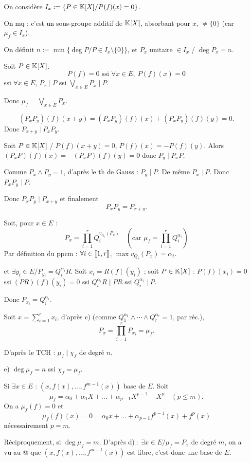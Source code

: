 \begin{solution}
On considère $I_x:=\{P\in\mathbb K[X]/P(f)(x)=0\}$.

On mq : c'est un sous-groupe additif de $\mathbb K[X]$, absorbant pour $x$,
$\neq\{0\}$ (car $\mu_f\in I_x$).

On définit $n:=\min\{\deg P/P\in I_x\setminus\{0\}\}$, et $P_x$ unitaire
$\in I_x$ / $\deg P_x=n$.

Soit $P\in\mathbb K[X]$.
\[
P(f)=0 \text{ ssi } \forall x\in E,\ P(f)(x)=0
\]
ssi $\forall x\in E$, $P_x\mid P$ ssi $\bigvee_{x\in E}P_x\mid P$.

Donc $\mu_f=\bigvee_{x\in E}P_x$.

\[
(P_xP_y)(f)(x+y)=(P_xP_y)(f)(x)+(P_xP_y)(f)(y)=0.
\]
Donc $P_{x+y}\mid P_xP_y$.

Soit $P\in\mathbb K[X]$ / $P(f)(x+y)=0$, $P(f)(x)=-P(f)(y)$.
Alors $(P_xP)(f)(x)=- (P_xP)(f)(y)=0$ donc $P_y\mid P_xP$.

Comme $P_x\wedge P_y=1$, d'après le th de Gauss : $P_y\mid P$.
De même $P_x\mid P$. Donc $P_xP_y\mid P$.

Donc $P_xP_y\mid P_{x+y}$ et finalement
\[
\boxed{P_xP_y=P_{x+y}}.
\]

Soit, pour $x\in E$ :
\[
P_x=\prod_{i=1}^r Q_i^{v_{Q_i}(P_x)}
\quad(\text{car }\mu_f=\prod_{i=1}^r Q_i^{\alpha_i})
\]
Par définition du ppcm : $\forall i\in\llbracket 1,r\rrbracket$,
$\max v_{Q_i}(P_x)=\alpha_i$.

et $\exists y_i\in E/P_{y_i}=Q_i^{\alpha_i}R$.
Soit $x_i=R(f)(y_i)$ ; soit $P\in\mathbb K[X]$ :
$P(f)(x_i)=0$ ssi $(PR)(f)(y_i)=0$ ssi $Q_i^{\alpha_i}R\mid PR$ ssi
$Q_i^{\alpha_i}\mid P$.

Donc $P_{x_i}=Q_i^{\alpha_i}$.

Soit $x=\sum_{i=1}^r x_i$, d'après c) (comme
$Q_1^{\alpha_1}\wedge\cdots\wedge Q_r^{\alpha_r}=1$, par réc.),
\[
P_x=\prod_{i=1}^r P_{x_i}=\mu_f.
\]

D'après le TCH : $\mu_f\mid\chi_f$ de degré $n$.

e) $\deg\mu_f=n$ ssi $\chi_f=\mu_f$.

Si $\exists x\in E$ : $(x,f(x),\dots,f^{m-1}(x))$ base de $E$.
Soit
\[
\mu_f=\alpha_0+\alpha_1X+\dots+\alpha_{p-1}X^{p-1}+X^p\quad (p\leq m).
\]
On a $\mu_f(f)=0$ et
\[
\mu_f(f)(x)=0=\alpha_0x+\dots+\alpha_{p-1}f^{p-1}(x)+f^p(x)
\]
nécessairement $p=m$.

Réciproquement, si $\deg\mu_f=m$.
D'après d) : $\exists x\in E/\mu_f=P_x$ de degré $m$, on a vu au @ que
$(x,f(x),\dots,f^{m-1}(x))$ est libre, c'est donc une base de $E$.
\end{solution}

